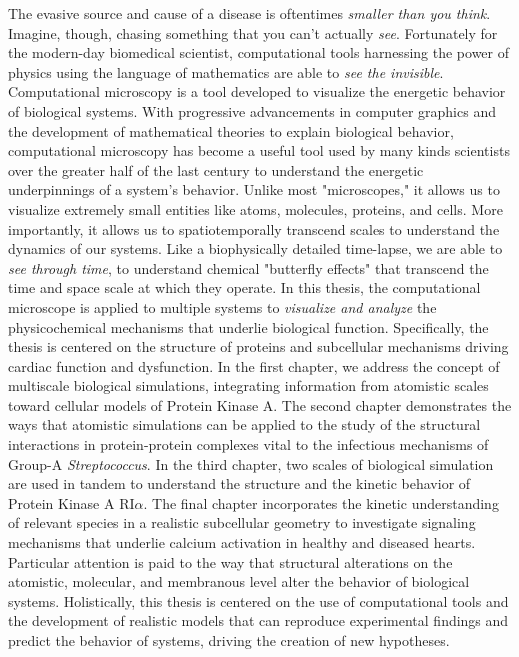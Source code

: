 \documentclass[12pt]{ucsddissertation}
\begin{document}
 

\begin{dissertationabstract}
\vspace{0.3pt}

The evasive source and cause of a disease is oftentimes \textit{smaller than you think}. Imagine, though, chasing something that you can't actually \textit{see}. Fortunately for the modern-day biomedical scientist, computational tools harnessing the power of physics using the language of mathematics are able to \textit{see the invisible}. Computational microscopy is a tool developed to visualize the energetic behavior of biological systems. With progressive advancements in computer graphics and the development of mathematical theories to explain biological behavior, computational microscopy has become a useful tool used by many kinds scientists over the greater half of the last century to understand the energetic underpinnings of a system's behavior. Unlike most "microscopes," it allows us to visualize extremely small entities like atoms, molecules, proteins, and cells. More importantly, it allows us to spatiotemporally transcend scales to understand the dynamics of our systems. Like a biophysically detailed time-lapse, we are able to \textit{see through time}, to understand chemical "butterfly effects" that transcend the time and space scale at which they operate. In this thesis, the computational microscope is applied to multiple systems to \textit{visualize and analyze} the physicochemical mechanisms that underlie biological function. Specifically, the thesis is centered on the structure of proteins and subcellular mechanisms driving cardiac function and dysfunction. In the first chapter, we address the concept of multiscale biological simulations, integrating information from atomistic scales toward cellular models of Protein Kinase A. The second chapter demonstrates the ways that atomistic simulations can be applied to the study of the structural interactions in protein-protein complexes vital to the infectious mechanisms of Group-A \textit{Streptococcus}. In the third chapter, two scales of biological simulation are used in tandem to understand the structure and the kinetic behavior of Protein Kinase A RI$\alpha$. The final chapter incorporates the kinetic understanding of relevant species in a realistic subcellular geometry to investigate signaling mechanisms that underlie calcium activation in healthy and diseased hearts. Particular attention is paid to the way that structural alterations on the atomistic, molecular, and membranous level alter the behavior of biological systems. Holistically, this thesis is centered on the use of computational tools and the development of realistic models that can reproduce experimental findings and predict the behavior of systems, driving the creation of new hypotheses. 

\end{dissertationabstract}
\end{document}

